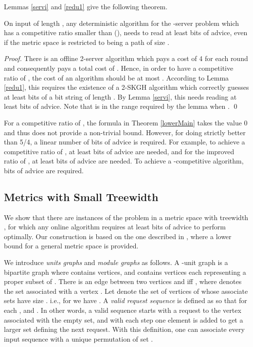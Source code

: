 Lemmas \ref{servi} and \ref{redu1} give the following theorem.

\begin{theorem} \label{lowerMain}
On input of length , any deterministic algorithm for the -server problem which has a competitive ratio smaller than  (), needs to read at least  bits of advice, even if the metric space is restricted to being a path of size . 
\end{theorem}

\begin{proof}
There is an offline 2-server algorithm which pays a cost of 4 for each round and consequently pays a total cost of . Hence, in order to have a competitive ratio of , the cost of an algorithm should be at most . According to Lemma \ref{redu1}, this requires the existence of a 2-SKGH algorithm which correctly guesses at least  bits of a bit string of length . By Lemma \ref{servi}, this needs reading at least  bits of advice. Note that  is in the range required by the lemma when . \qed
\end{proof}


For a competitive ratio of , the formula in Theorem \ref{lowerMain} takes the value 0 and thus does not provide a non-trivial bound. However, for doing strictly better than 5/4, a linear number of bits of advice is required. For example, to achieve a competitive ratio of , at least  bits of advice are needed, and for the improved ratio of , at least  bits of advice are needed. To achieve a -competitive algorithm,  bits of advice are required.

\subsection{Metrics with Small Treewidth}
We show that there are instances of the \ks problem in a metric space with treewidth , for which any online algorithm requires at least  bits of advice to perform optimally. Our construction is based on the one described in \cite{Bock11}, where a lower bound for a general metric space is provided. 

We introduce \textit{units graphs} and \textit{module graphs} as follows. A -unit graph is a bipartite graph  where  contains  vertices, and  contains  vertices each representing a proper subset of . There is an edge between two vertices  and  iff , where  denotes the set associated with a vertex . 
Let  denote the set of vertices of  whose associate sets have size . i.e., for  we have . A \textit{valid request sequence} is defined as  so that for each ,  and . In other words, a valid sequence starts with a request to the vertex associated with the empty set, and with each step one element is added to get a larger set defining the next request. With this definition, one can associate every input sequence  with a unique permutation  of set .

